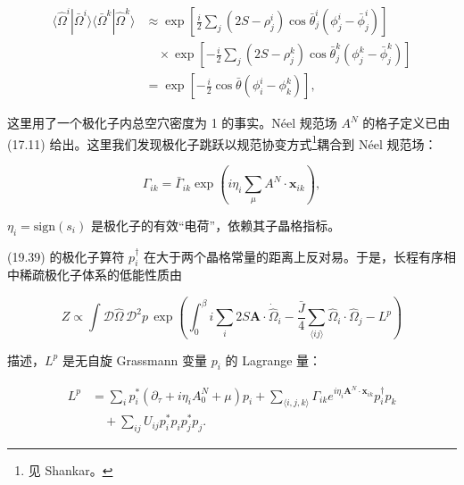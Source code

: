 \begin{align*}
\langle \hat {\Omega} ^ {i} | \bar {\Omega} ^ {i} \rangle \langle \bar {\Omega} ^ {k} | \hat {\Omega} ^ {k} \rangle & \approx \exp \left[ \frac {i}{2} \sum_ {j} \left( 2S - \rho_{j} ^ {i} \right) \cos \bar {\theta}_{j} ^ {i} \left( \phi_{j} ^ {i} - \bar {\phi}_{j} ^ {i} \right) \right]\\
& \quad \times \exp \left[ - \frac {i}{2} \sum_ {j} \left( 2S - \rho_{j} ^ {k} \right) \cos \bar {\theta}_{j} ^ {k} \left( \phi_{j} ^ {k} - \bar {\phi}_{j} ^ {k} \right) \right]\\
& = \exp \left[ - \frac {i}{2} \cos \bar {\theta} \left( \phi_{i} ^ {i} - \phi_{k} ^ {k} \right) \right] ,
\tag{19.57}
\end{align*}

这里用了一个极化子内总空穴密度为 1 的事实。Néel 规范场 $A^{N}$ 的格子定义已由 (17.11) 给出。这里我们发现极化子跳跃以规范协变方式\footnote{见 Shankar。}耦合到 Néel 规范场：

\begin{equation*}
\Gamma_{ik} = \bar {\Gamma}_{ik} \exp \left( i \eta_{i} \sum_{\mu} A^{N} \cdot \mathbf {x}_{ik} \right) ,
\tag{19.58}
\end{equation*}

$\eta_{i}=\mathrm{sign}(s_{i})$ 是极化子的有效“电荷”，依赖其子晶格指标。

(19.39) 的极化子算符 $p_{i}^{\dagger}$ 在大于两个晶格常量的距离上反对易。于是，长程有序相中稀疏极化子体系的低能性质由

\begin{equation*}
Z \propto \int \mathcal {D} \hat {\Omega} \, \mathcal {D} ^ {2} p \, \exp \left( \int_ {0} ^ {\beta} i \sum_ {i} 2S \mathbf {A} \cdot \dot {\hat {\Omega}} _ {i} - \frac {\bar {J}}{4} \sum_{\langle ij \rangle} \hat {\Omega} _ {i} \cdot \hat {\Omega} _ {j} - L ^ {p} \right)
\tag{19.59}
\end{equation*}

描述，$L^{p}$ 是无自旋 Grassmann 变量 $p_{i}$ 的 Lagrange 量：

\begin{align*}
L ^ {p} & = \sum_ {i} p _ {i} ^ {*} \left( \partial_ {\tau} + i \eta_ {i} A _ {0} ^ {N} + \mu \right) p _ {i} + \sum_{\langle i, j, k \rangle} \Gamma_{ik} e ^ {i \eta_{i} \mathbf {A}^{N} \cdot \mathbf {x}_{ik}} p _ {i} ^ {\dagger} p _ {k}\\
& \quad + \sum_ {ij} U _ {ij} p _ {i} ^ {*} p _ {i} p _ {j} ^ {*} p _ {j} .
\tag{19.60}
\end{align*}

